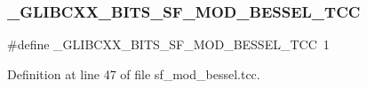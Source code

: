 \subsubsection{\texorpdfstring{\+\_\+\+G\+L\+I\+B\+C\+X\+X\+\_\+\+B\+I\+T\+S\+\_\+\+S\+F\+\_\+\+M\+O\+D\+\_\+\+B\+E\+S\+S\+E\+L\+\_\+\+T\+CC}{\_GLIBCXX\_BITS\_SF\_MOD\_BESSEL\_TCC}}
{\footnotesize\ttfamily \#define \+\_\+\+G\+L\+I\+B\+C\+X\+X\+\_\+\+B\+I\+T\+S\+\_\+\+S\+F\+\_\+\+M\+O\+D\+\_\+\+B\+E\+S\+S\+E\+L\+\_\+\+T\+CC~1}



Definition at line 47 of file sf\+\_\+mod\+\_\+bessel.\+tcc.

